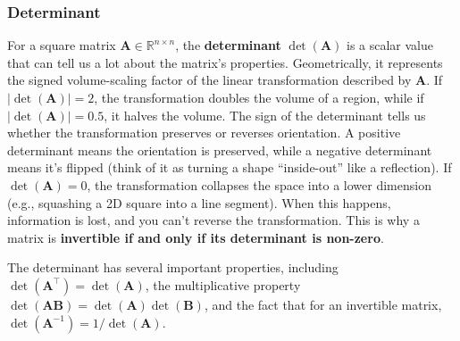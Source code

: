 \subsubsection{Determinant}
For a square matrix $ \mathbf{A} \in \mathbb{R}^{n\times n} $, the \textbf{determinant} $ \det(\mathbf{A}) $ is a scalar value that can tell us a lot about the matrix's properties. Geometrically, it represents the signed volume-scaling factor of the linear transformation described by $ \mathbf{A} $. If $ |\det(\mathbf{A})| = 2 $, the transformation doubles the volume of a region, while if $ |\det(\mathbf{A})| = 0.5 $, it halves the volume. The sign of the determinant tells us whether the transformation preserves or reverses orientation. A positive determinant means the orientation is preserved, while a negative determinant means it's flipped (think of it as turning a shape ``inside-out'' like a reflection). If $ \det(\mathbf{A}) = 0 $, the transformation collapses the space into a lower dimension (e.g., squashing a 2D square into a line segment). When this happens, information is lost, and you can't reverse the transformation. This is why a matrix is \textbf{invertible if and only if its determinant is non-zero}.

The determinant has several important properties, including $ \det(\mathbf{A}^\top) = \det(\mathbf{A}) $, the multiplicative property $ \det(\mathbf{AB}) = \det(\mathbf{A})\det(\mathbf{B}) $, and the fact that for an invertible matrix, $ \det(\mathbf{A}^{-1}) = 1 / \det(\mathbf{A}) $.

